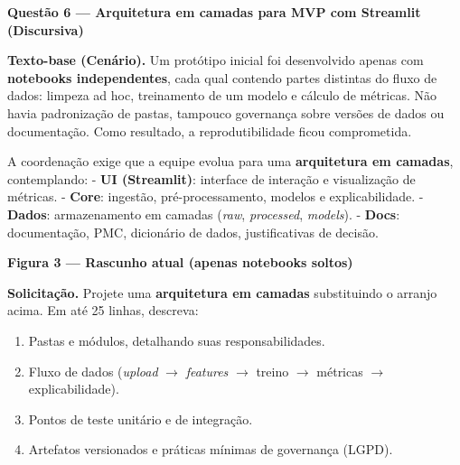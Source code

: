 \documentclass[12pt,a4paper]{article}
\begin{document}
\newpage
\noindent\textbf{Questão 6 — Arquitetura em camadas para MVP com Streamlit (Discursiva)}

\par\noindent\textbf{Texto-base (Cenário).}  
Um protótipo inicial foi desenvolvido apenas com \textbf{notebooks independentes}, cada qual contendo partes distintas do fluxo de dados: limpeza ad hoc, treinamento de um modelo e cálculo de métricas. Não havia padronização de pastas, tampouco governança sobre versões de dados ou documentação. Como resultado, a reprodutibilidade ficou comprometida.  

A coordenação exige que a equipe evolua para uma \textbf{arquitetura em camadas}, contemplando:  
- \textbf{UI (Streamlit)}: interface de interação e visualização de métricas.  
- \textbf{Core}: ingestão, pré-processamento, modelos e explicabilidade.  
- \textbf{Dados}: armazenamento em camadas (\textit{raw}, \textit{processed}, \textit{models}).  
- \textbf{Docs}: documentação, PMC, dicionário de dados, justificativas de decisão.  

\vspace{0.5em}
\noindent\textbf{Figura 3 — Rascunho atual (apenas notebooks soltos)}  

\begin{center}
\end{center}

\noindent\textbf{Solicitação.}  
Projete uma \textbf{arquitetura em camadas} substituindo o arranjo acima. Em até 25 linhas, descreva:  
\begin{enumerate}[label=\roman*)]
\item Pastas e módulos, detalhando suas responsabilidades.  
\item Fluxo de dados (\textit{upload} $\to$ \textit{features} $\to$ treino $\to$ métricas $\to$ explicabilidade).  
\item Pontos de teste unitário e de integração.  
\item Artefatos versionados e práticas mínimas de governança (LGPD).  
\end{enumerate}
\end{document}
